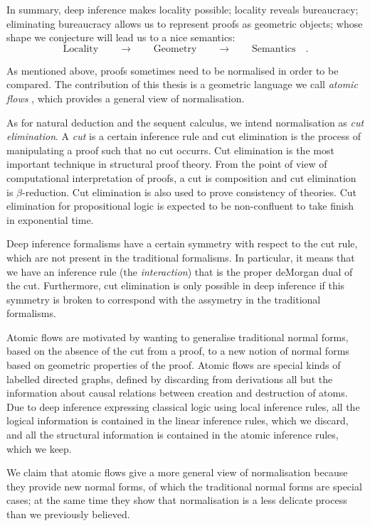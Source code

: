 In summary, deep inference makes locality possible; locality reveals bureaucracy; eliminating bureaucracy allows us to represent proofs as geometric objects; whose shape we conjecture will lead us to a nice semantics:
\[
\mbox{Locality}\qquad\rightarrow\qquad\mbox{Geometry}\qquad\rightarrow\qquad\mbox{Semantics}\quad.
\]

As mentioned above, proofs sometimes need to be normalised in order to be compared. The contribution of this thesis is a geometric language we call \emph{atomic flows} \cite{GuglGund:07:Normalis:lr}, which provides a general view of normalisation.

As for natural deduction and the sequent calculus, we intend normalisation as \emph{cut elimination}. A \emph{cut} is a certain inference rule and cut elimination is the process of manipulating a proof such that no cut occurrs. Cut elimination is the most important technique in structural proof theory. From the point of view of computational interpretation of proofs, a cut is composition and cut elimination is $\beta$-reduction. Cut elimination is also used to prove consistency of theories. Cut elimination for propositional logic is expected to be non-confluent to take finish in exponential time.

Deep inference formalisms have a certain symmetry with respect to the cut rule, which are not present in the traditional formalisms. In particular, it means that we have an inference rule (the \emph{interaction}) that is the proper deMorgan dual of the cut. Furthermore, cut elimination is only possible in deep inference if this symmetry is broken to correspond with the assymetry in the traditional formalisms.

Atomic flows are motivated by wanting to generalise traditional normal forms, based on the absence of the cut from a proof, to a new notion of normal forms based on geometric properties of the proof. Atomic flows are special kinds of labelled directed graphs, defined by discarding from derivations all but the information about causal relations between creation and destruction of atoms. Due to deep inference expressing classical logic using local inference rules, all the logical information is contained in the linear inference rules, which we discard, and all the structural information is contained in the atomic inference rules, which we keep.

We claim that atomic flows give a more general view of normalisation because they provide new normal forms, of which the traditional normal forms are special cases; at the same time they show that normalisation is a less delicate process than we previously believed.


